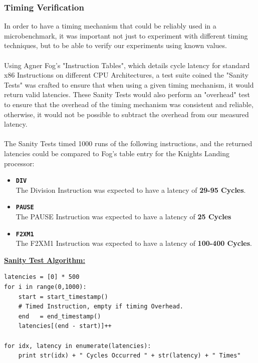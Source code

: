 \documentclass[bsc,frontabs,twoside,singlespacing,parskip,deptreport]{infthesis}     %
\begin{document}
\subsubsection{Timing Verification}
In order to have a timing mechanism that could be reliably used in a microbenchmark, it was important not just to experiment with different timing techniques, but to be able to verify our experiments using known values. \\
\\
Using Agner Fog's "Instruction Tables"\cite{inst_tables}, which details cycle latency for standard x86 Instructions on different CPU Architectures, a test suite coined the "Sanity Tests" was crafted to ensure that when using a given timing mechanism, it would return valid latencies. These Sanity Tests would also perform an "overhead" test to ensure that the overhead of the timing mechanism was consistent and reliable, otherwise, it would not be possible to subtract the overhead from our measured latency. \\
\\
The Sanity Tests timed 1000 runs of the following instructions, and the returned latencies could be compared to Fog's table entry for the Knights Landing processor:
\begin{itemize}
    \item{{\bf \texttt{DIV}} \\
        The Division Instruction was expected to have a latency of \textbf{29-95 Cycles}.
    }
    \item{{\bf \texttt{PAUSE}} \\
        The PAUSE Instruction was expected to have a latency of \textbf{25 Cycles}
    }
    \item{{\bf \texttt{F2XM1}} \\
        The F2XM1 Instruction was expected to have a latency of \textbf{100-400 Cycles}.
    }
\end{itemize}

\underline{\textbf{Sanity Test Algorithm:}}\label{sanity-test-algo} \\
\begin{verbatim}
latencies = [0] * 500
for i in range(0,1000):
    start = start_timestamp()
    # Timed Instruction, empty if timing Overhead.
    end   = end_timestamp()
    latencies[(end - start)]++

for idx, latency in enumerate(latencies):
    print str(idx) + " Cycles Occurred " + str(latency) + " Times"
\end{verbatim}
\end{document}
